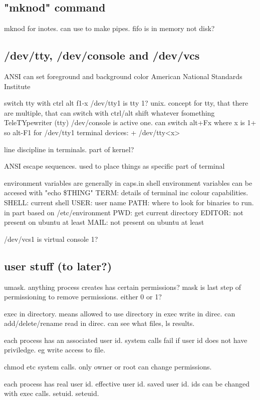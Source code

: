 \subsection{"mknod" command}

mknod for inotes. can use to make pipes. fifo is in memory not disk?

\subsection{/dev/tty, /dev/console and /dev/vcs}

ANSI can set foreground and background color
American National Standards Institute

switch tty with ctrl alt f1-x
/dev/tty1 is tty 1?
unix. concept for tty, that there are multiple, that can switch with ctrl/alt shift whatever fsomething
TeleTYpewriter (tty)
/dev/console is active one. can switch alt+Fx where x is 1+ so alt-F1 for /dev/tty1
terminal devices:
+ /dev/tty<x>

line discipline in terminals. part of kernel?

ANSI escape sequences. used to place things as specific part of terminal

environment variables are generally in caps.in shell environment variables can be accesed with "echo \$THING"
TERM: details of terminal inc colour capabilities.
SHELL: current shell
USER: user name
PATH: where to look for binaries to run. in part based on /etc/environment
PWD: get current directory
EDITOR: not present on ubuntu at least
MAIL: not present on ubuntu at least

/dev/vcs1 is virtual console 1?

\subsection{user stuff (to later?)}

umask. anything process creates has certain permissions? mask is last step of permissioning to remove permissions. either 0 or 1?

exec in directory. means allowed to use directory in exec
write in direc. can add/delete/rename
read in direc. can see what files, ls results.

each process has an associated user id.
system calls fail if user id does not have priviledge. eg write access to file.

chmod etc system calls.
only owner or root can change permissions.

each process has real user id. effective user id. saved user id.
ids can be changed with exec calls. setuid. seteuid.

